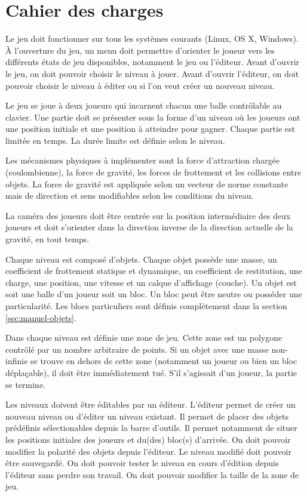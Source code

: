 \section{Cahier des charges}

Le jeu doit fonctionner sur tous les systèmes courants (Linux, OS X, Windows).
À l'ouverture du jeu, un menu doit permettre d'orienter le joueur vers
les différents états de jeu disponibles, notamment le jeu ou l'éditeur.
Avant d'ouvrir le jeu, on doit pouvoir choisir le niveau à jouer. Avant
d'ouvrir l'éditeur, on doit pouvoir choisir le niveau à éditer ou si l'on
veut créer un nouveau niveau.

Le jeu se joue à deux joueurs qui incarnent chacun une balle contrôlable au clavier.
Une partie doit se présenter sous la forme d'un niveau où les joueurs
ont une position initiale et une position à atteindre pour gagner.
Chaque partie est limitée en temps. La durée limite est définie selon le niveau.

Les mécanismes physiques à implémenter sont la force d'attraction chargée
(coulombienne), la force de gravité, les forces de frottement et les
collisions entre objets. La force de gravité est appliquée selon un vecteur
de norme constante mais de direction et sens modifiables selon les
conditions du niveau.

La caméra des joueurs doit être centrée sur la position intermédiaire
des deux joueurs et doit s'orienter dans la direction inverse
de la direction actuelle de la gravité, en tout temps.

Chaque niveau est composé d'objets. Chaque objet possède une masse,
un coefficient de frottement statique et dynamique, un coefficient
de restitution, une charge, une position, une vitesse et un calque d'affichage
(couche). Un objet est soit une balle d'un joueur soit un bloc. Un bloc
peut être neutre ou posséder une particularité.
Les blocs particuliers sont définis complètement dans la section
\ref{sec:manuel-objets}.

Dans chaque niveau est définie une zone de jeu. Cette zone est un polygone
contrôlé par un nombre arbitraire de points. Si un objet avec une masse
non-infinie se trouve en dehors de cette zone (notamment un joueur
ou bien un bloc déplaçable), il doit être immédiatement tué. S'il s'agissait
d'un joueur, la partie se termine.

Les niveaux doivent être éditables par un éditeur. L'éditeur permet
de créer un nouveau niveau ou d'éditer un niveau existant. Il permet
de placer des objets prédéfinis sélectionables depuis la barre d'outils.
Il permet notamment de situer les positions initiales des joueurs
et du(des) bloc(s) d'arrivée. On doit pouvoir modifier la polarité des objets
depuis l'éditeur. Le niveau modifié doit pouvoir être sauvegardé. On doit
pouvoir tester le niveau en cours d'édition depuis l'éditeur sans perdre
son travail. On doit pouvoir modifier la taille de la zone de jeu.
